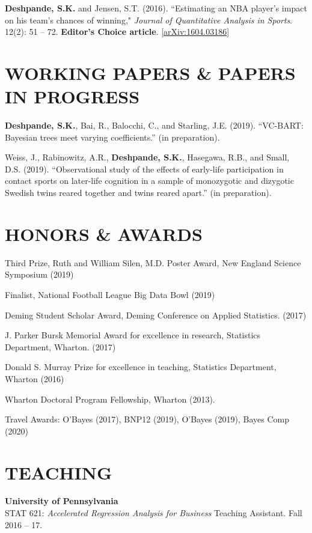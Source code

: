 \documentclass[margin]{res}
\begin{document}
\begin{resume}
\textbf{Deshpande, S.K.} and Jensen, S.T. (2016). ``Estimating an NBA player's impact on his team's chances of winning," \textit{Journal of Quantitative Analysis in Sports}. 12(2): 51 -- 72. \textbf{Editor's Choice article}. \href{https://arxiv.org/abs/1604.03186}{[arXiv:1604.03186]}

\section{WORKING PAPERS \& PAPERS IN PROGRESS}

\textbf{Deshpande, S.K.}, Bai, R., Balocchi, C., and Starling, J.E. (2019). ``VC-BART: Bayesian trees meet varying coefficients.'' (in preparation).

Weiss, J., Rabinowitz, A.R., \textbf{Deshpande, S.K.}, Hasegawa, R.B., and Small, D.S. (2019). ``Observational study of the effects of early-life participation in contact sports on later-life cognition in a sample of monozygotic and dizygotic Swedish twins reared together and twins reared apart.'' (in preparation).

\section{HONORS \& AWARDS} 

Third Prize, Ruth and William Silen, M.D. Poster Award, New England Science Symposium (2019)

Finalist, National Football League Big Data Bowl (2019)

Deming Student Scholar Award, Deming Conference on Applied Statistics. (2017)

J. Parker Bursk Memorial Award for excellence in research, Statistics Department, Wharton. (2017)

Donald S. Murray Prize for excellence in teaching, Statistics Department, Wharton (2016)

Wharton Doctoral Program Fellowship, Wharton (2013).

Travel Awards: O'Bayes (2017), BNP12 (2019), O'Bayes (2019), Bayes Comp (2020)

\section{TEACHING}

\textbf{University of Pennsylvania} \\

STAT 621: {\it Accelerated Regression Analysis for Business} Teaching Assistant. Fall 2016 -- 17.


\end{resume}
\end{document}
